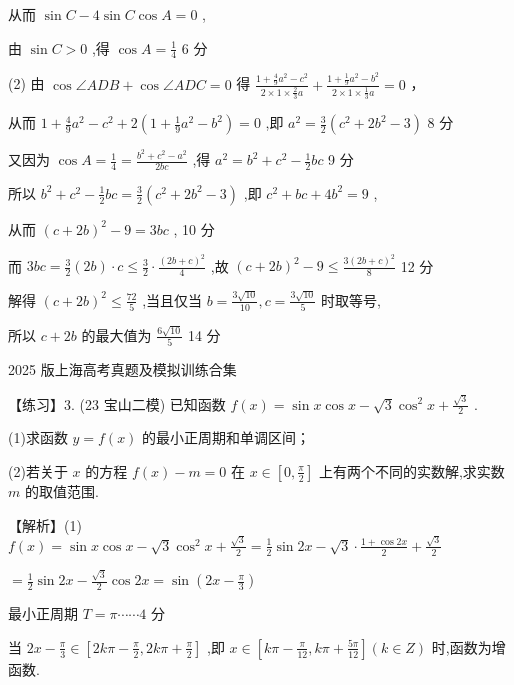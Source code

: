 \documentclass[10pt]{article}
\begin{document}
从而 \(\sin C - 4\sin C\cos A = 0\) ,

由 \(\sin C > 0\) ,得 \(\cos A = \frac{1}{4}\) 6 分

(2) 由 \(\cos \angle {ADB} + \cos \angle {ADC} = 0\) 得 \(\frac{1 + \frac{4}{9}{a}^{2} - {c}^{2}}{2 \times  1 \times  \frac{2}{3}a} + \frac{1 + \frac{1}{9}{a}^{2} - {b}^{2}}{2 \times  1 \times  \frac{1}{3}a} = 0\) ，

从而 \(1 + \frac{4}{9}{a}^{2} - {c}^{2} + 2\left( {1 + \frac{1}{9}{a}^{2} - {b}^{2}}\right)  = 0\) ,即 \({a}^{2} = \frac{3}{2}\left( {{c}^{2} + 2{b}^{2} - 3}\right)\) 8 分

又因为 \(\cos A = \frac{1}{4} = \frac{{b}^{2} + {c}^{2} - {a}^{2}}{2bc}\) ,得 \({a}^{2} = {b}^{2} + {c}^{2} - \frac{1}{2}{bc}\) 9 分

所以 \({b}^{2} + {c}^{2} - \frac{1}{2}{bc} = \frac{3}{2}\left( {{c}^{2} + 2{b}^{2} - 3}\right)\) ,即 \({c}^{2} + {bc} + 4{b}^{2} = 9\) ,

从而 \({\left( c + 2b\right) }^{2} - 9 = {3bc}\) , 10 分

而 \({3bc} = \frac{3}{2}\left( {2b}\right)  \cdot  c \leq  \frac{3}{2} \cdot  \frac{{\left( 2b + c\right) }^{2}}{4}\) ,故 \({\left( c + 2b\right) }^{2} - 9 \leq  \frac{3{\left( 2b + c\right) }^{2}}{8}\) 12 分

解得 \({\left( c + 2b\right) }^{2} \leq  \frac{72}{5}\) ,当且仅当 \(b = \frac{3\sqrt{10}}{10},c = \frac{3\sqrt{10}}{5}\) 时取等号,

所以 \(c + {2b}\) 的最大值为 \(\frac{6\sqrt{10}}{5}\) 14 分

2025 版上海高考真题及模拟训练合集

【练习】3. (23 宝山二模) 已知函数 \(f\left( x\right)  = \sin x\cos x - \sqrt{3}{\cos }^{2}x + \frac{\sqrt{3}}{2}\) .

(1)求函数 \(y = f\left( x\right)\) 的最小正周期和单调区间；

(2)若关于 \(x\) 的方程 \(f\left( x\right)  - m = 0\) 在 \(x \in  \left\lbrack  {0,\frac{\pi }{2}}\right\rbrack\) 上有两个不同的实数解,求实数 \(m\) 的取值范围.

【解析】(1) \(f\left( x\right)  = \sin x\cos x - \sqrt{3}{\cos }^{2}x + \frac{\sqrt{3}}{2} = \frac{1}{2}\sin {2x} - \sqrt{3} \cdot  \frac{1 + \cos {2x}}{2} + \frac{\sqrt{3}}{2}\)

\(= \frac{1}{2}\sin {2x} - \frac{\sqrt{3}}{2}\cos {2x} = \sin \left( {{2x} - \frac{\pi }{3}}\right)\)

最小正周期 \(T = \pi \cdots \cdots 4\) 分

当 \({2x} - \frac{\pi }{3} \in  \left\lbrack  {{2k\pi } - \frac{\pi }{2},{2k\pi } + \frac{\pi }{2}}\right\rbrack\) ,即 \(x \in  \left\lbrack  {{k\pi } - \frac{\pi }{12},{k\pi } + \frac{5\pi }{12}}\right\rbrack  \left( {k \in  Z}\right)\) 时,函数为增函数.
\end{document}
